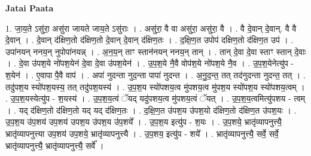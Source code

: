 \documentclass[17pt]{extarticle}
\begin{document}
\textbf{Jatai Paata} \newline

1. जा॒य॒ते ऽसु॑रा॒ असु॑रा जायते जाय॒ते ऽसु॑राः । . असु॑रा॒ वै वा असु॑रा॒ असु॑रा॒ वै । . वै दे॒वान् दे॒वान्. वै वै दे॒वान् । . दे॒वान् द॑क्षिण॒तो द॑क्षिण॒तो दे॒वान् दे॒वान् द॑क्षिण॒तः । . द॒क्षि॒ण॒त उपोप॑ दक्षिण॒तो द॑क्षिण॒त उप॑ । . उपा॑नयन् ननय॒न् नुपोपा॑नयन्न् । . अ॒न॒य॒न् ताꣳ स्तान॑नयन् ननय॒न् तान् । . तान् दे॒वा दे॒वा स्ताꣳ स्तान् दे॒वाः । . दे॒वा उ॑पश॒ये नो॑पश॒येन॑ दे॒वा दे॒वा उ॑पश॒येन॑ । . उ॒प॒श॒ये नै॒वै वोप॑श॒ये नो॑पश॒ये नै॒व । . उ॒प॒श॒येनेत्यु॑प - श॒येन॑ । . ए॒वापा पै॒वै वाप॑ । . अपा॑ नुदन्ता नुद॒न्ता पापा॑ नुदन्त । . अ॒नु॒द॒न्त॒ तत् तद॑नुदन्ता नुदन्त॒ तत् । . तदु॑पश॒य स्यो॑पश॒यस्य॒ तत् तदु॑पश॒यस्य॑ । . उ॒प॒श॒य स्यो॑पशय॒त्व मु॑पशय॒त्व मु॑पश॒य स्यो॑पश॒य स्यो॑पशय॒त्वम् । . उ॒प॒श॒यस्येत्यु॑प - श॒यस्य॑ । . उ॒प॒श॒य॒त्वं ॅयद् यदु॑पशय॒त्व मु॑पशय॒त्वं ॅयत् । . उ॒प॒श॒य॒त्वमित्यु॑पशय - त्वम् । . यद् द॑क्षिण॒तो द॑क्षिण॒तो यद् यद् द॑क्षिण॒तः । . द॒क्षि॒ण॒त उ॑पश॒य उ॑पश॒यो द॑क्षिण॒तो द॑क्षिण॒त उ॑पश॒यः । . उ॒प॒श॒य उ॑प॒शय॑ उप॒शय॑ उपश॒य उ॑पश॒य उ॑प॒शये᳚ । . उ॒प॒श॒य इत्यु॑प - श॒यः । . उ॒प॒शये॒ भ्रातृ॑व्यापनुत्त्यै॒ भ्रातृ॑व्यापनुत्त्या उप॒शय॑ उप॒शये॒ भ्रातृ॑व्यापनुत्त्यै । . उ॒प॒शय॒ इत्यु॑प - शये᳚ । . भ्रातृ॑व्यापनुत्त्यै॒ सर्वे॒ सर्वे॒ भ्रातृ॑व्यापनुत्त्यै॒ भ्रातृ॑व्यापनुत्त्यै॒ सर्वे᳚ । \newline
\end{document}
